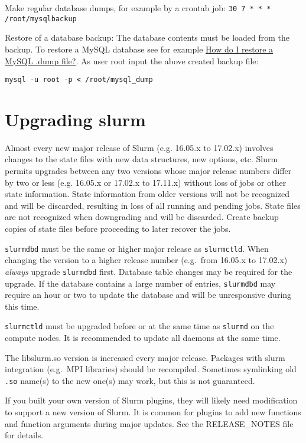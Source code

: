 Make regular database dumps, for example by a crontab job:
\texttt{30 7 * * * /root/mysqlbackup}

Restore of a database backup: The database contents must be loaded from the backup. To restore a MySQL database see for example \href{http://stackoverflow.com/questions/105776/how-do-i-restore-a-mysql-dump-file}{How do I restore a MySQL .dump file?}. As user root input the above created backup file:

\texttt{mysql -u root -p < /root/mysql\_dump}

\section{Upgrading slurm} \label{sec:slurmupgrade}

Almost every new major release of Slurm (e.g. 16.05.x to 17.02.x) involves changes to the state files with new data structures, new options, etc. Slurm permits upgrades between any two versions whose major release numbers differ by two or less (e.g. 16.05.x or 17.02.x to 17.11.x) without loss of jobs or other state information. State information from older versions will not be recognized and will be discarded, resulting in loss of all running and pending jobs. State files are not recognized when downgrading and will be discarded. Create backup copies of state files before proceeding to later recover the jobs.

\texttt{slurmdbd} must be the same or higher major release as \texttt{slurmctld}. When changing the version to a higher release number (e.g.\ from 16.05.x to 17.02.x) \emph{always} upgrade \texttt{slurmdbd} first. Database table changes may be required for the upgrade. If the database contains a large number of entries, \texttt{slurmdbd} may require an hour or two to update the database and will be unresponsive during this time.

\texttt{slurmctld} must be upgraded before or at the same time as \texttt{slurmd} on the compute nodes. It is recommended to update all daemons at the same time.

The libslurm.so version is increased every major release. Packages with slurm integration (e.g.\ MPI libraries) should be recompiled. Sometimes symlinking old \texttt{.so} name(s) to the new one(s) may work, but this is not guaranteed.

If you built your own version of Slurm plugins, they will likely need modification to support a new version of Slurm. It is common for plugins to add new functions and function arguments during major updates. See the RELEASE\_NOTES file for details.


